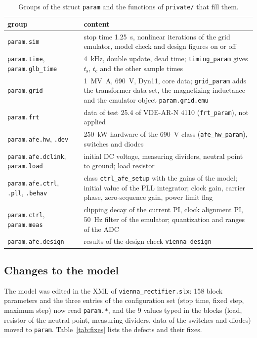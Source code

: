 \documentclass[11pt,a4paper]{scrartcl}
\newcommand{\ped}[1]{_{\mathrm{#1}}}
\newcommand{\code}[1]{\texttt{#1}}
\begin{document}
\begin{onehalfspace}
\begin{table}[H]
	\centering
	\caption{Groups of the struct \code{param} and the functions of \code{private/} that fill them.}
	\label{tab:param}
	\footnotesize
	\begin{tabularx}{\textwidth}{@{} l X @{}}
		\toprule
		group & content \\
		\midrule
		\code{param.sim} & stop time \SI{1.25}{\second}, nonlinear iterations of the grid emulator, model check and design figures on or off \\
		\code{param.time}, \code{param.glb\_time} & \SI{4}{\kilo\hertz}, double update, dead time; \code{timing\_param} gives $t\ped{s}$, $t\ped{c}$ and the other sample times \\
		\code{param.grid} & \SI{1}{\mega\volt\ampere}, \SI{690}{\volt}, Dyn11, core data; \code{grid\_param} adds the transformer data set, the magnetizing inductance and the emulator object \code{param.grid.emu} \\
		\code{param.frt} & data of test 25.4 of VDE-AR-N 4110 (\code{frt\_param}), not applied \\
		\code{param.afe.hw}, \code{.dev} & \SI{250}{\kilo\watt} hardware of the \SI{690}{\volt} class (\code{afe\_hw\_param}), switches and diodes \\
		\code{param.afe.dclink}, \code{param.load} & initial DC voltage, measuring dividers, neutral point to ground; load resistor \\
		\code{param.afe.ctrl}, \code{.pll}, \code{.behav} & class \code{ctrl\_afe\_setup} with the gains of the model; initial value of the PLL integrator; clock gain, carrier phase, zero-sequence gain, power limit flag \\
		\code{param.ctrl}, \code{param.meas} & clipping decay of the current PI, clock alignment PI, \SI{50}{\hertz} filter of the emulator; quantization and ranges of the ADC \\
		\code{param.afe.design} & results of the design check \code{vienna\_design} \\
		\bottomrule
	\end{tabularx}
\end{table}

\subsection{Changes to the model}
\label{sec:modelchanges}

The model was edited in the XML of \code{vienna\_rectifier.slx}: 158 block parameters and the three entries of the configuration set (stop time, fixed step, maximum step) now read \code{param.*}, and the 9 values typed in the blocks (load, resistor of the neutral point, measuring dividers, data of the switches and diodes) moved to \code{param}. Table~\ref{tab:fixes} lists the defects and their fixes.


\end{onehalfspace}
\end{document}
